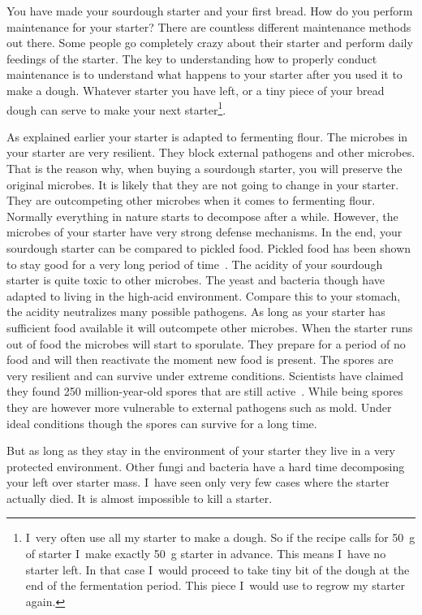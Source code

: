 You have made your sourdough starter and your first bread. How do you perform
maintenance for your starter? There are countless different maintenance
methods out there. Some people go completely crazy about their starter and
perform daily feedings of the starter. The key to understanding how to properly
conduct maintenance is to understand what happens to your starter after you
used it to make a dough. Whatever starter you have left, or a tiny piece of
your bread dough can serve to make your next starter\footnote{I~very often use all my
starter to make a dough. So if the recipe calls for \qty{50}{\gram} of starter I~make
exactly \qty{50}{\gram} starter in advance. This means I~have no starter left. In that
case I~would proceed to take tiny bit of the dough at the end of the
fermentation period. This piece I~would use to regrow my starter again.}.

As explained earlier your starter is adapted
to fermenting flour. The microbes in your starter are very resilient. They
block external pathogens and other microbes. That is the reason why, when
buying a sourdough starter, you will preserve the original microbes. It is
likely that they are not going to change in your starter. They are outcompeting other
microbes when it comes to fermenting flour. Normally everything in nature
starts to decompose after a while. However, the microbes of your starter have
very strong defense mechanisms. In the end, your sourdough starter can be
compared to pickled food. Pickled food has been shown to stay good for a very
long period of time~\cite{pickled+foods+expiration}. The acidity of your sourdough starter is quite
toxic to other microbes. The yeast and bacteria though have adapted to living
in the high-acid environment. Compare this to your stomach, the acidity
neutralizes many possible pathogens. As long as your starter has sufficient
food available it will outcompete other microbes. When the starter runs out of
food the microbes will start to sporulate. They prepare for a period of no
food and will then reactivate the moment new food is present. The
spores are very resilient and can survive under extreme conditions.
Scientists have claimed they found 250 million-year-old spores that are still
active~\cite{old+spores}. While being spores
they are however more vulnerable to external pathogens such as mold.
Under ideal conditions though the spores can survive for a
long time.

But as long as they stay in the environment of your starter they live
in a very protected environment. Other fungi and bacteria have a hard time decomposing your left over starter mass.
I~have seen only very few cases where the starter actually died. It is almost impossible
to kill a starter.

